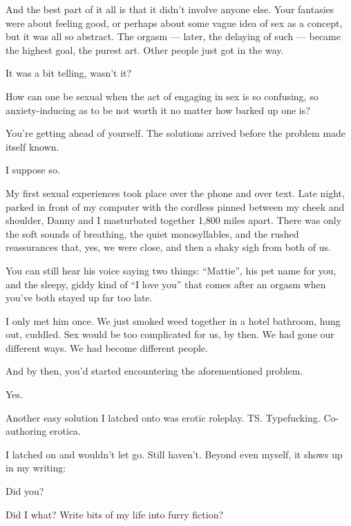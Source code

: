 \begin{paracol}{2}
\begin{leftcolumn}
\begin{ally}
And the best part of it all is that it didn't involve anyone else. Your fantasies were about feeling good, or perhaps about some vague idea of sex as a concept, but it was all so abstract. The orgasm --- later, the delaying of such --- became the highest goal, the purest art. Other people just got in the way.
\end{ally}
It was a bit telling, wasn't it?
\newpage

\noindent How can one be sexual when the act of engaging in sex is so confusing, so anxiety-inducing as to be not worth it no matter how barked up one is?

\begin{ally}
You're getting ahead of yourself. The solutions arrived before the problem made itself known.
\end{ally}
I suppose so.

My first sexual experiences took place over the phone and over text. Late night, parked in front of my computer with the cordless pinned between my cheek and shoulder, Danny and I masturbated together 1,800 miles apart. There was only the soft sounds of breathing, the quiet monosyllables, and the rushed reassurances that, yes, we were close, and then a shaky sigh from both of us.

\begin{ally}
You can still hear his voice saying two things: ``Mattie'', his pet name for you, and the sleepy, giddy kind of ``I love you'' that comes after an orgasm when you've both stayed up far too late.
\end{ally}
I only met him once. We just smoked weed together in a hotel bathroom, hung out, cuddled. Sex would be too complicated for us, by then. We had gone our different ways. We had become different people.

\begin{ally}
And by then, you'd started encountering the aforementioned problem.
\end{ally}
Yes.

Another easy solution I latched onto was erotic roleplay. TS. Typefucking. Co-authoring erotica.

I latched on and wouldn't let go. Still haven't. Beyond even myself, it shows up in my writing:

\begin{ally}
Did you?
\end{ally}
Did I what? Write bits of my life into furry fiction?


\end{leftcolumn}
\end{paracol}
